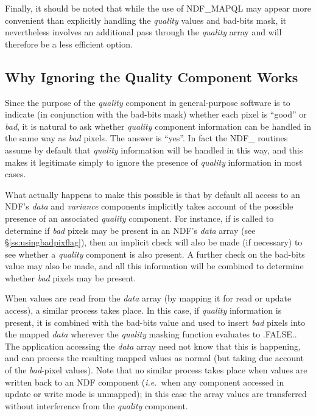 \documentclass[twoside,11pt,nolof]{starlink}
\providecommand{\st}[1]{{\emph{#1}}}
\begin{document}
Finally, it should be noted that while the use of NDF\_MAPQL may appear more
convenient than explicitly handling the \st{quality\/} values and bad-bits
mask, it nevertheless involves an additional pass through the \st{quality\/}
array and will therefore be a less efficient option.

\subsection{Why Ignoring the Quality Component Works}

Since the purpose of the \st{quality\/} component in general-purpose software is
to indicate (in conjunction with the bad-bits mask) whether each pixel is
``good'' or \st{bad}, it is natural to ask whether \st{quality\/} component
information can be handled in the same way as \st{bad\/} pixels.
The answer is ``yes''.
In fact the NDF\_ routines assume by default that \st{quality\/} information
will be handled in this way, and this makes it legitimate simply to ignore
the presence of \st{quality\/} information in most cases.

What actually happens to make this possible is that by default all access to
an NDF's \st{data\/} and \st{variance\/} components implicitly takes account
of the possible  presence of an associated \st{quality\/} component.
For instance, if  is called to determine if \st{bad\/} pixels may be
present in an NDF's \st{data\/} array (see \S\ref{ss:usingbadpixflag}), then an
implicit check will also be made (if necessary) to see whether a \st{quality\/}
component is also present.
A further check on the bad-bits value may also be made, and all this
information will be combined to determine whether \st{bad\/} pixels may be
present.

When values are read from the \st{data\/} array (by mapping it for read or update
access), a similar process takes place.
In this case, if \st{quality\/} information is present, it is combined with the
bad-bits value and used to insert \st{bad\/} pixels into the mapped \st{data\/}
wherever the \st{quality\/} masking function evaluates to .FALSE..
The application accessing the \st{data\/} array need not know that this is
happening, and can process the resulting mapped values as normal (but taking
due account of the \st{bad\/}-pixel values).
Note that no similar process takes place when values are written back to an
NDF component (\st{i.e.}\ when any component accessed in update or write
mode is unmapped); in this case the array values are transferred without
interference from the \st{quality\/} component.
\end{document}
